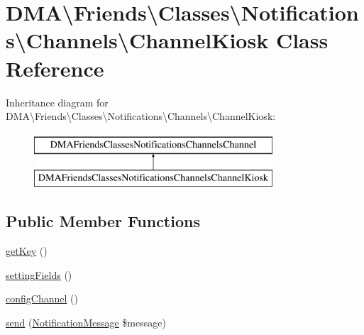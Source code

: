 \hypertarget{classDMA_1_1Friends_1_1Classes_1_1Notifications_1_1Channels_1_1ChannelKiosk}{\section{D\+M\+A\textbackslash{}Friends\textbackslash{}Classes\textbackslash{}Notifications\textbackslash{}Channels\textbackslash{}Channel\+Kiosk Class Reference}
\label{classDMA_1_1Friends_1_1Classes_1_1Notifications_1_1Channels_1_1ChannelKiosk}
}
Inheritance diagram for D\+M\+A\textbackslash{}Friends\textbackslash{}Classes\textbackslash{}Notifications\textbackslash{}Channels\textbackslash{}Channel\+Kiosk\+:\begin{figure}[H]
\begin{center}
\leavevmode
\includegraphics[height=2.000000cm]{d5/d75/classDMA_1_1Friends_1_1Classes_1_1Notifications_1_1Channels_1_1ChannelKiosk}
\end{center}
\end{figure}
\subsection*{Public Member Functions}
\begin{DoxyCompactItemize}
\item 
\hyperlink{classDMA_1_1Friends_1_1Classes_1_1Notifications_1_1Channels_1_1ChannelKiosk_a2b78d43d774c4a3ad51bda474f63867f}{get\+Key} ()
\item 
\hyperlink{classDMA_1_1Friends_1_1Classes_1_1Notifications_1_1Channels_1_1ChannelKiosk_aed0a11ddc080fa7252d6fe6a3faa7b29}{setting\+Fields} ()
\item 
\hyperlink{classDMA_1_1Friends_1_1Classes_1_1Notifications_1_1Channels_1_1ChannelKiosk_ac40190da8647ca059590db8800bbbf2b}{config\+Channel} ()
\item 
\hyperlink{classDMA_1_1Friends_1_1Classes_1_1Notifications_1_1Channels_1_1ChannelKiosk_ab3ad4b0bf7c129767eb323528a439ed8}{send} (\hyperlink{classDMA_1_1Friends_1_1Classes_1_1Notifications_1_1NotificationMessage}{Notification\+Message} \$message)
\end{DoxyCompactItemize}


